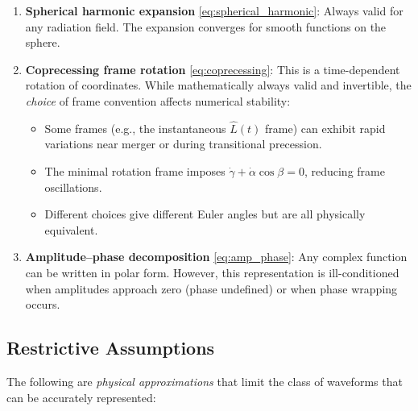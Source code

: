\documentclass[11pt,a4paper]{article}
\begin{document}
\begin{enumerate}
    \item \textbf{Spherical harmonic expansion} \eqref{eq:spherical_harmonic}: Always valid for any radiation field. The expansion converges for smooth functions on the sphere.

    \item \textbf{Coprecessing frame rotation} \eqref{eq:coprecessing}: This is a time-dependent rotation of coordinates. While mathematically always valid and invertible, the \emph{choice} of frame convention affects numerical stability:
    \begin{itemize}
        \item Some frames (e.g., the instantaneous $\hat{L}(t)$ frame) can exhibit rapid variations near merger or during transitional precession.
        \item The minimal rotation frame \cite{boyle2011} imposes $\dot{\gamma} + \dot{\alpha}\cos\beta = 0$, reducing frame oscillations.
        \item Different choices give different Euler angles but are all physically equivalent.
    \end{itemize}

    \item \textbf{Amplitude--phase decomposition} \eqref{eq:amp_phase}: Any complex function can be written in polar form. However, this representation is ill-conditioned when amplitudes approach zero (phase undefined) or when phase wrapping occurs.
\end{enumerate}

\subsection{Restrictive Assumptions}

The following are \emph{physical approximations} that limit the class of waveforms that can be accurately represented:
\end{document}
